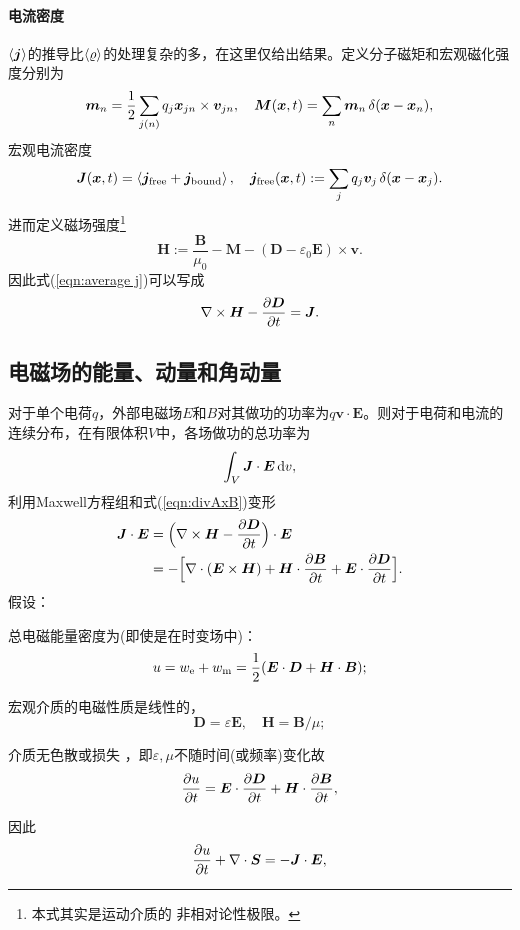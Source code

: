 \paragraph{电流密度}
$\left\langle \bm j\right\rangle$的推导比$\left\langle \varrho\right\rangle$的处理复杂的多，在这里仅给出结果。定义分子磁矩和宏观磁化强度分别为
\[
    \bm m_n=\frac12\sum_{j(n)}q_j\bm x_{jn}\times\bm v_{jn},\quad\bm M(\bm x,t)=\sum_n\bm m_n\mathop{}\!\delta(\bm x-\bm x_n),
\]
宏观电流密度
\[
    \bm J(\bm x,t)=\left\langle \bm j_\text{free}+\bm j_\text{bound}\right\rangle,\quad\bm j_\text{free}(\bm x,t):=\sum_jq_j\bm v_j\mathop{}\!\delta(\bm x-\bm x_j).
\]
进而定义磁场强度\footnote{本式其实是运动介质的%
非相对论性极限。}
\[
    \bm H:=\frac{\bm B}{\mu_0}-\bm M-(\bm D-\varepsilon_0\bm E)\times\bm v.
\]
因此式(\ref{eqn:average j})可以写成
\[
    \nabla\times\bm H-\frac{\partial^{\;\!\!}\bm D}{\partial t^{\;\!\!}}=\bm J.
\] 

\subsection{电磁场的能量、动量和角动量}
对于单个电荷$q$，外部电磁场$E$和$B$对其做功的功率为$q\bm v\cdot\bm E$。则对于电荷和电流的连续分布，在有限体积$V$中，各场做功的总功率为
\[
    \int_V\bm J\cdot\bm E\mathop{}\!\mathrm{d} v,
\]
利用Maxwell方程组和式(\ref{eqn:divAxB})变形
\begin{align*}
    \bm J\cdot\bm E&=\Bigkh{\curl\bm H-\pv{\bm D}t}\cdot\bm E\\
    &=-\Bigfkh{\div(\bm E\times\bm H)+\bm H\cdot\pv{\bm B}t+\bm E\cdot\pv{\bm D}t}.
\end{align*}
假设：
\begin{compactenum}
    \item 总电磁能量密度为(即使是在时变场中)：
    \[
        u=w_\elc+w_\text m=\frac12(\bm E\cdot\bm D+\bm H\cdot\bm B);%
    \]
	\item 宏观介质的电磁性质是线性的，
    \[
        \bm D=\varepsilon\bm E,\quad\bm H=\bm B/\mu;
    \]
    \item 介质无色散或损失%
    ，即$\varepsilon,\mu$不随时间(或频率)变化故
    \[
        \pv ut=\bm E\cdot\pv{\bm D}t+\bm H\cdot\pv{\bm B}t,
    \]
\end{compactenum}
因此 
\begin{align}
    \frac{\partial^{\;\!\!}u}{\partial t^{\;\!\!}}+\nabla\cdot\bm S=-\bm J\cdot\bm E,
\end{align}
